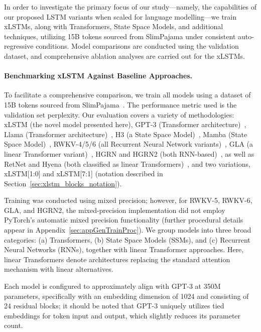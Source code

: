In order to investigate the primary focus of our study—namely, the capabilities of our proposed LSTM variants when scaled for language modelling—we train xLSTMs, along with Transformers, State Space Models, and additional techniques, utilizing 15B tokens sourced from SlimPajama under consistent auto-regressive conditions. Model comparisons are conducted using the validation dataset, and comprehensive ablation analyses are carried out for the xLSTMs.

\paragraph{Benchmarking xLSTM Against Baseline Approaches.} To facilitate a comprehensive comparison, we train all models using a dataset of 15B tokens sourced from SlimPajama~\citep{Soboleva:23}. The performance metric used is the validation set perplexity. Our evaluation covers a variety of methodologies: xLSTM (the novel model presented here), GPT-3 (Transformer architecture)~\citep{Brown:20short}, Llama (Transformer architecture)~\citep{Touvron:23arxiv}, H3 (a State Space Model)~\citep{Fu:23}, Mamba (State Space Model)~\citep{Gu:24arxiv}, RWKV-4/5/6 (all Recurrent Neural Network variants)~\citep{Peng:23arxivshort, Peng:24arxivshort}, GLA (a linear Transformer variant)~\citep{Yang:23arxiv}, HGRN and HGRN2 (both RNN-based)~\citep{Qin:23, Qin:24arxiv}, as well as RetNet and Hyena (both classified as linear Transformers)~\citep{Sun:23arxiv, Poli:23}, and two variations, xLSTM[1:0] and xLSTM[7:1] (notation described in Section~\ref{sec:xlstm_blocks_notation}). 

Training was conducted using mixed precision; however, for RWKV-5, RWKV-6, GLA, and HGRN2, the mixed-precision implementation did not employ PyTorch's automatic mixed precision functionality (further procedural details appear in Appendix~\ref{sec:appGenTrainProc}). We group models into three broad categories: (a) Transformers, (b) State Space Models (SSMs), and (c) Recurrent Neural Networks (RNNs), together with linear Transformer approaches. Here, linear Transformers denote architectures replacing the standard attention mechanism with linear alternatives. 

Each model is configured to approximately align with GPT-3 at 350M parameters, specifically with an embedding dimension of 1024 and consisting of 24 residual blocks; it should be noted that GPT-3 uniquely utilizes tied embeddings for token input and output, which slightly reduces its parameter count. 

